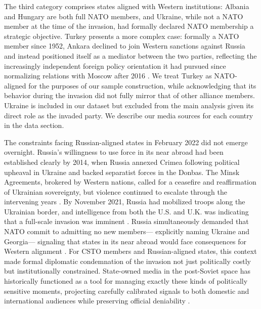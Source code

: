 \documentclass[12pt]{article}
\begin{document}
The third category comprises states aligned with Western institutions: Albania and Hungary are both full NATO members, and Ukraine, while not a NATO member at the time of the invasion, had formally declared NATO membership a strategic objective. Turkey presents a more complex case: formally a NATO member since 1952, Ankara declined to join Western sanctions against Russia and instead positioned itself as a mediator between the two parties, reflecting the increasingly independent foreign policy orientation it had pursued since normalizing relations with Moscow after 2016 \citep{mankoff_turkeys_2022}. We treat Turkey as NATO-aligned for the purposes of our sample construction, while acknowledging that its behavior during the invasion did not fully mirror that of other alliance members. Ukraine is included in our dataset but excluded from the main analysis given its direct role as the invaded party. We describe our media sources for each country in the data section.

The constraints facing Russian-aligned states in February 2022 did not emerge overnight. Russia's willingness to use force in its near abroad had been established clearly by 2014, when Russia annexed Crimea following political upheaval in Ukraine and backed separatist forces in the Donbas. The Minsk Agreements, brokered by Western nations, called for a ceasefire and reaffirmation of Ukrainian sovereignty, but violence continued to escalate through the intervening years \citep{walker_conflict_2023}. By November 2021, Russia had mobilized troops along the Ukrainian border, and intelligence from both the U.S. and U.K. was indicating that a full-scale invasion was imminent \citep{walker_conflict_2023}. Russia simultaneously demanded that NATO commit to admitting no new members--- explicitly naming Ukraine and Georgia--- signaling that states in its near abroad would face consequences for Western alignment \citep{al_jazeera_us_2022}. For CSTO members and Russian-aligned states, this context made formal diplomatic condemnation of the invasion not just politically costly but institutionally constrained. State-owned media in the post-Soviet space has historically functioned as a tool for managing exactly these kinds of politically sensitive moments, projecting carefully calibrated signals to both domestic and international audiences while preserving official deniability \citep{cohen_theatre_1987, oates_television_2006, guriev_spin_2022}.
\end{document}
